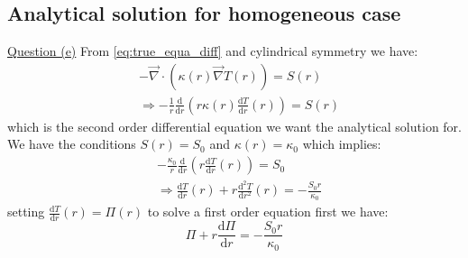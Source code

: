 \subsection{Analytical solution for homogeneous case}
\label{sec:solution_anal}
\underline{Question (e)}
From \autoref{eq:true_equa_diff} and cylindrical symmetry we have:
\begin{equation}
    \begin{aligned}
        & -\vec{\nabla} \cdot (\kappa(r)\vec{\nabla}T(r)) = S(r) \\
        & \Rightarrow -\frac{1}{r}\frac{\mathrm{d}}{\mathrm{d} r}\left(r \kappa(r) \frac{\mathrm{d}T}{\mathrm{d}r}(r)\right) = S(r)
    \end{aligned}
\end{equation}
which is the second order differential equation we want the analytical solution for. We have the conditions $S(r) = S_0$ and $\kappa(r) = \kappa_0$ which implies:
\begin{equation}
    \begin{aligned}
        & -\frac{\kappa_0}{r}\frac{\mathrm{d}}{\mathrm{d}r}\left(r\frac{\mathrm{d}T}{\mathrm{d}r}(r)\right) = S_0 \\
        & \Rightarrow \frac{\mathrm{d}T}{\mathrm{d}r}(r) + r\frac{\mathrm{d}^2T}{\mathrm{d}r^2}(r) = -\frac{S_0 r}{\kappa_0}
    \end{aligned}
\end{equation}
setting $\frac{\mathrm{d}T}{\mathrm{d}r}(r) = \Pi(r)$ to solve a first order equation first we have:
\begin{equation}
    \Pi + r\frac{\mathrm{d}\Pi}{\mathrm{d}r} = -\frac{S_0 r}{\kappa_0}
    \label{eq:first_order_ode}
\end{equation}

